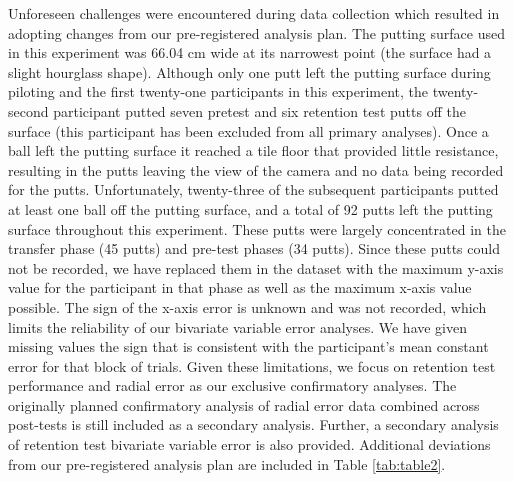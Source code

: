 \documentclass[
  english,
  man,floatsintext]{apa7}
\begin{document}
Unforeseen challenges were encountered during data collection which resulted in adopting changes from our pre-registered analysis plan. The putting surface used in this experiment was 66.04 cm wide at its narrowest point (the surface had a slight hourglass shape). Although only one putt left the putting surface during piloting and the first twenty-one participants in this experiment, the twenty-second participant putted seven pretest and six retention test putts off the surface (this participant has been excluded from all primary analyses). Once a ball left the putting surface it reached a tile floor that provided little resistance, resulting in the putts leaving the view of the camera and no data being recorded for the putts. Unfortunately, twenty-three of the subsequent participants putted at least one ball off the putting surface, and a total of 92 putts left the putting surface throughout this experiment. These putts were largely concentrated in the transfer phase (45 putts) and pre-test phases (34 putts). Since these putts could not be recorded, we have replaced them in the dataset with the maximum y-axis value for the participant in that phase as well as the maximum x-axis value possible. The sign of the x-axis error is unknown and was not recorded, which limits the reliability of our bivariate variable error analyses. We have given missing values the sign that is consistent with the participant's mean constant error for that block of trials. Given these limitations, we focus on retention test performance and radial error as our exclusive confirmatory analyses. The originally planned confirmatory analysis of radial error data combined across post-tests is still included as a secondary analysis. Further, a secondary analysis of retention test bivariate variable error is also provided. Additional deviations from our pre-registered analysis plan are included in Table \ref{tab:table2}.
\end{document}
